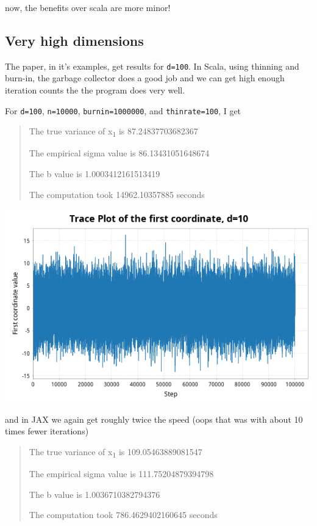 \documentclass[letterpaper]{article}
\begin{document}
now, the benefits over scala are more minor!
\subsection{Very high dimensions}
\label{sec:org5a4983f}

The paper, in it's examples, get results for \texttt{d=100}. In Scala, using thinning and burn-in, the garbage collector does a good job and we can get high enough iteration counts the the program does very well.

For \texttt{d=100}, \texttt{n=10000}, \texttt{burnin=1000000}, and \texttt{thinrate=100}, I get 

\begin{quote}
The true variance of x\textsubscript{1} is 87.24837703682367

The empirical sigma value is 86.13431051648674

The b value is 1.0003412161513419

The computation took 14962.10357885 seconds
\end{quote}

\begin{center}
\includegraphics[width=.9\linewidth]{./Figures/adaptive_trace_scala_high_d.png}
\end{center}

and in JAX we again get roughly twice the speed (oops that was with about 10 times fewer iterations)

\begin{quote}
The true variance of x\textsubscript{1} is 109.05463889081547

The empirical sigma value is 111.75204879394798

The b value is 1.0036710382794376

The computation took 786.4629402160645 seconds
\end{quote}
\end{document}
